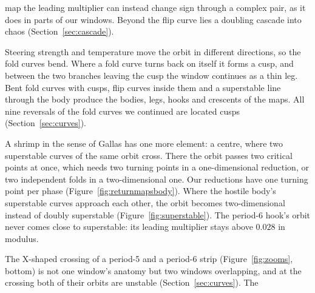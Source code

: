 map the leading multiplier can instead change sign through a complex pair, as it does in parts of our windows. Beyond the flip curve lies a doubling cascade
into chaos (Section~\ref{sec:cascade}).

Steering strength and temperature move the orbit in different directions, so the fold curves bend. Where a fold curve
turns back on itself it forms a cusp, and between the two branches leaving the cusp the window continues as a thin leg.
Bent fold curves with cusps, flip curves inside them and a superstable line through the body produce the bodies, legs,
hooks and crescents of the maps. All nine reversals of the fold curves we continued are located cusps
(Section~\ref{sec:curves}).

A shrimp in the sense of Gallas has one more element: a centre, where two superstable curves of the same orbit cross.
There the orbit passes two critical points at once, which needs two turning points in a one-dimensional reduction, or
two independent folds in a two-dimensional one. Our reductions have one turning point per phase
(Figure~\ref{fig:returnmapsbody}). Where the hostile body's superstable curves approach each other, the orbit becomes
two-dimensional instead of doubly superstable (Figure~\ref{fig:superstable}). The period-6 hook's orbit never comes
close to superstable: its leading multiplier stays above $0.028$ in modulus.

The X-shaped crossing of a period-5 and a period-6 strip (Figure~\ref{fig:zooms}, bottom) is not one window's anatomy
but two windows overlapping, and at the crossing both of their orbits are unstable (Section~\ref{sec:curves}). The
